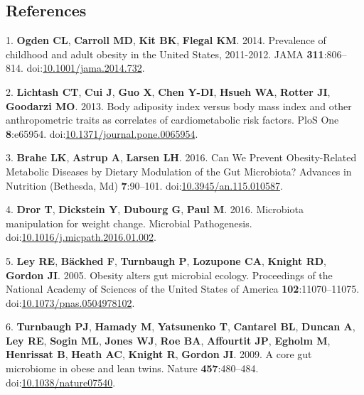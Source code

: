 \documentclass[12pt,]{article}
\begin{document}
\newpage

\subsection*{References}\label{references}

\hypertarget{refs}{}
\hypertarget{ref-ogdenux5fprevalenceux5f2014}{}
1. \textbf{Ogden CL}, \textbf{Carroll MD}, \textbf{Kit BK},
\textbf{Flegal KM}. 2014. Prevalence of childhood and adult obesity in
the United States, 2011-2012. JAMA \textbf{311}:806--814.
doi:\href{https://doi.org/10.1001/jama.2014.732}{10.1001/jama.2014.732}.

\hypertarget{ref-lichtashux5fbodyux5f2013}{}
2. \textbf{Lichtash CT}, \textbf{Cui J}, \textbf{Guo X}, \textbf{Chen
Y-DI}, \textbf{Hsueh WA}, \textbf{Rotter JI}, \textbf{Goodarzi MO}.
2013. Body adiposity index versus body mass index and other
anthropometric traits as correlates of cardiometabolic risk factors.
PloS One \textbf{8}:e65954.
doi:\href{https://doi.org/10.1371/journal.pone.0065954}{10.1371/journal.pone.0065954}.

\hypertarget{ref-braheux5fcanux5f2016}{}
3. \textbf{Brahe LK}, \textbf{Astrup A}, \textbf{Larsen LH}. 2016. Can
We Prevent Obesity-Related Metabolic Diseases by Dietary Modulation of
the Gut Microbiota? Advances in Nutrition (Bethesda, Md)
\textbf{7}:90--101.
doi:\href{https://doi.org/10.3945/an.115.010587}{10.3945/an.115.010587}.

\hypertarget{ref-drorux5fmicrobiotaux5f2016}{}
4. \textbf{Dror T}, \textbf{Dickstein Y}, \textbf{Dubourg G},
\textbf{Paul M}. 2016. Microbiota manipulation for weight change.
Microbial Pathogenesis.
doi:\href{https://doi.org/10.1016/j.micpath.2016.01.002}{10.1016/j.micpath.2016.01.002}.

\hypertarget{ref-leyux5fobesityux5f2005}{}
5. \textbf{Ley RE}, \textbf{Bäckhed F}, \textbf{Turnbaugh P},
\textbf{Lozupone CA}, \textbf{Knight RD}, \textbf{Gordon JI}. 2005.
Obesity alters gut microbial ecology. Proceedings of the National
Academy of Sciences of the United States of America
\textbf{102}:11070--11075.
doi:\href{https://doi.org/10.1073/pnas.0504978102}{10.1073/pnas.0504978102}.

\hypertarget{ref-turnbaughux5fcoreux5f2009}{}
6. \textbf{Turnbaugh PJ}, \textbf{Hamady M}, \textbf{Yatsunenko T},
\textbf{Cantarel BL}, \textbf{Duncan A}, \textbf{Ley RE}, \textbf{Sogin
ML}, \textbf{Jones WJ}, \textbf{Roe BA}, \textbf{Affourtit JP},
\textbf{Egholm M}, \textbf{Henrissat B}, \textbf{Heath AC},
\textbf{Knight R}, \textbf{Gordon JI}. 2009. A core gut microbiome in
obese and lean twins. Nature \textbf{457}:480--484.
doi:\href{https://doi.org/10.1038/nature07540}{10.1038/nature07540}.
\end{document}
